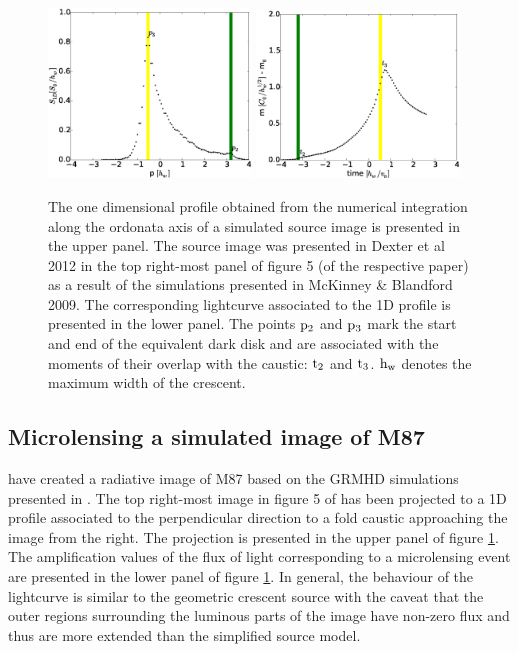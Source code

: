 \documentclass[usenatbib]{mn2e}
\begin{document}
\begin{figure}
\centering
    \includegraphics[width = 0.48\textwidth]{figures/M87_shape.eps}
        \includegraphics[width = 0.48\textwidth]{figures/M87_lc.eps}
\caption{\label{fig:M87_plots} The one dimensional profile obtained
  from the numerical integration along the ordonata axis of a simulated source
  image is presented in the upper panel. The source image was presented in 
 Dexter et al 2012 in the top right-most panel of figure 5 
(of the respective paper) as a result of the simulations 
presented in McKinney \& Blandford 2009. The corresponding
  lightcurve associated to the 1D profile is presented in the lower
  panel. The points $\rm p_2$ and $\rm p_3$ mark the start and 
  end of the equivalent
  dark disk and are associated with the moments of their overlap with
  the caustic: $\rm t_2$ and $\rm t_3$. $\rm h_{w}$ denotes the maximum width of the crescent.}
\end{figure}


\subsection{Microlensing a simulated image of M87}

\cite{2012MNRAS.421.1517D} have created a radiative image of M87 based on the GRMHD simulations presented in \citep{2009MNRAS.394L.126M}. 
The top right-most image in figure 5 of \cite{2012MNRAS.421.1517D} has been projected to a 1D profile associated to the perpendicular 
direction to a fold caustic approaching the image from the right. The projection is presented in the upper panel of figure \ref{fig:M87_plots}. 
The amplification values of the flux of light corresponding to a 
microlensing event are presented in the lower panel of figure \ref{fig:M87_plots}. 
In general, the behaviour of the lightcurve is similar to the geometric crescent source with the caveat that the outer regions 
surrounding the luminous parts of the image have non-zero flux and thus are more extended than the simplified source model.
\end{document}
